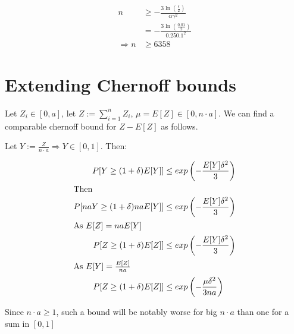 \documentclass[a4paper]{scrreprt}
\begin{document}
\begin{align*}
	n & \geq - \frac{3 \ln\left(\frac{\epsilon}{2}\right)}{\alpha \gamma^2} \\
	& = - \frac{3 \ln\left(\frac{0.01}{2}\right)}{0.25 0.1^2} \\
	\Rightarrow n & \geq 6358
\end{align*}

\section{Extending Chernoff bounds}

Let $Z_i \in [0, a]$, let $Z := \sum_{i=1}^n{Z_i}$, $\mu = E[Z] \in [0, n \cdot
a]$. We can find a comparable chernoff bound for $Z - E[Z]$ as follows.

Let $Y := \frac{Z}{n \cdot a} \Rightarrow Y \in [0, 1]$. Then:

\begin{align*}
	P[Y \geq (1 + \delta) E[Y]] & \leq exp\left(- \frac{E[Y] \delta^2}{3}\right) \\
	\intertext{Then}
	P[n a Y \geq (1 + \delta) n a E[Y]] & \leq exp\left(- \frac{E[Y] \delta^2}{3}\right) \\
	\intertext{As $E[Z] = n a E[Y]$}
	P[Z \geq (1 + \delta) E[Z]]  & \leq exp\left(- \frac{E[Y] \delta^2}{3}\right) \\
	\intertext{As $E[Y] = \frac{E[Z]}{n a}$}
	P[Z \geq (1 + \delta) E[Z]]  & \leq exp\left(- \frac{\mu \delta^2}{3 n a}\right)
\end{align*}

Since $n \cdot a \geq 1$, such a bound will be notably worse for big $n \cdot
a$ than one for a sum in $[0, 1]$
\end{document}
